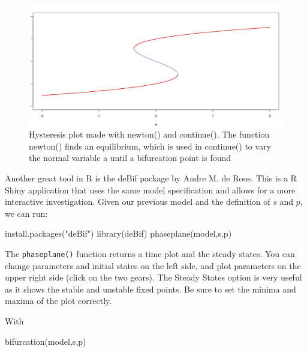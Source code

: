\documentclass[
  a4paper,
  DIV=11,
  numbers=noendperiod]{scrreprt}
\newenvironment{Shaded}{\begin{snugshade}}{\end{snugshade}}
\newcommand{\FunctionTok}[1]{\textcolor[rgb]{0.28,0.35,0.67}{#1}}
\newcommand{\NormalTok}[1]{\textcolor[rgb]{0.00,0.23,0.31}{#1}}
\newcommand{\StringTok}[1]{\textcolor[rgb]{0.13,0.47,0.30}{#1}}
\begin{document}
\begin{figure}

{\centering \includegraphics{media/ch4n/image3.jpg}

}

\caption{\label{fig-ch4n-img3-old-51}Hysteresis plot made with newton()
and continue(). The function newton() finds an equilibrium, which is
used in continue() to vary the normal variable a until a bifurcation
point is found}

\end{figure}

Another great tool in R is the deBif package by Andre M. de Roos. This
is a R Shiny application that uses the same model specification and
allows for a more interactive investigation. Given our previous model
and the definition of \(s\) and \(p\), we can run:

\begin{Shaded}
\begin{Highlighting}[]
\FunctionTok{install.packages}\NormalTok{(}\StringTok{"deBif"}\NormalTok{)}
\FunctionTok{library}\NormalTok{(deBif)}
\FunctionTok{phaseplane}\NormalTok{(model,s,p)}
\end{Highlighting}
\end{Shaded}

The \texttt{phaseplane()} function returns a time plot and the steady
states. You can change parameters and initial states on the left side,
and plot parameters on the upper right side (click on the two gears).
The Steady States option is very useful as it shows the stable and
unstable fixed points. Be sure to set the minima and maxima of the plot
correctly.

With

\begin{Shaded}
\begin{Highlighting}[]
\FunctionTok{bifurcation}\NormalTok{(model,s,p)}
\end{Highlighting}
\end{Shaded}
\end{document}
